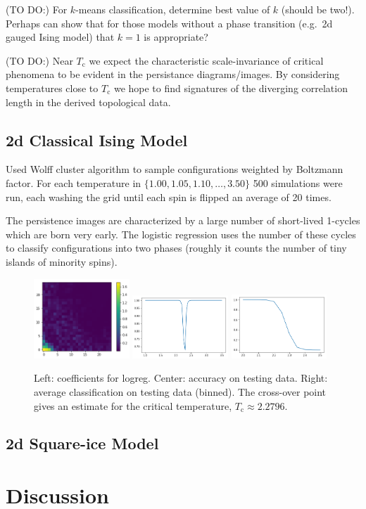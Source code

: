 \documentclass[11pt]{article}
\begin{document}
(TO DO:) For $k$-means classification, determine best value of $k$ (should be two!). Perhaps can show that for those models without a phase transition (e.g.~2d gauged Ising model) that $k=1$ is appropriate?

(TO DO:) Near $T_\text{c}$ we expect the characteristic scale-invariance of critical phenomena to be evident in the persistance diagrams/images. By considering temperatures close to $T_\text{c}$ we hope to find signatures of the diverging correlation length in the derived topological data.


\subsection{2d Classical Ising Model}
Used Wolff cluster algorithm to sample configurations weighted by Boltzmann factor. For each temperature in $\{1.00,1.05,1.10,\ldots,3.50\}$ 500 simulations were run, each washing the grid until each spin is flipped an average of 20 times.

The persistence images are characterized by a large number of short-lived 1-cycles which are born very early. The logistic regression uses the number of these cycles to classify configurations into two phases (roughly it counts the number of tiny islands of minority spins).

\begin{figure}[h]
    \centering
    \includegraphics[width=0.32\textwidth]{logreg_2d_ising}
    \includegraphics[width=0.32\textwidth]{logreg_acc_2d_ising}
    \includegraphics[width=0.32\textwidth]{logreg_avg_2d_ising}
    \caption{Left: coefficients for logreg. Center: accuracy on testing data. Right: average classification on testing data (binned). The cross-over point gives an estimate for the critical temperature, $T_\text{c}\approx 2.2796$.}
\end{figure}

\subsection{2d Square-ice Model}

\section{Discussion}
\end{document}

